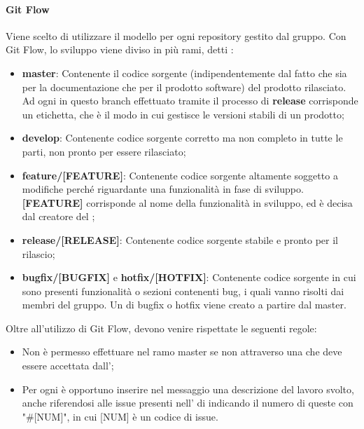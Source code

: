 \paragraph{Git Flow}
Viene scelto di utilizzare il modello  per ogni repository gestito dal gruppo.
Con Git Flow, lo sviluppo viene diviso in più rami, detti :
\begin{itemize}
	\item \textbf{master}: Contenente il codice sorgente (indipendentemente dal fatto che sia per la documentazione che per il prodotto software) del prodotto rilasciato.
	Ad ogni  in questo branch effettuato tramite il processo di \textbf{release} corrisponde un etichetta, che è il modo in cui  gestisce le versioni stabili di un prodotto;
	\item \textbf{develop}: Contenente codice sorgente corretto ma non completo in tutte le parti, non pronto per essere rilasciato;
	\item \textbf{feature/[FEATURE]}: Contenente codice sorgente altamente soggetto a modifiche perché riguardante una funzionalità in fase di sviluppo.
	\textbf{[FEATURE]} corrisponde al nome della funzionalità in sviluppo, ed è decisa dal creatore del ;
	\item \textbf{release/[RELEASE]}: Contenente codice sorgente stabile e pronto per il rilascio;
	\item \textbf{bugfix/[BUGFIX]} e \textbf{hotfix/[HOTFIX]}: Contenente codice sorgente in cui sono presenti funzionalità o sezioni contenenti bug, i quali vanno risolti dai membri del gruppo.
	Un  di bugfix o hotfix viene creato a partire dal  master.
\end{itemize}

Oltre all'utilizzo di Git Flow, devono venire rispettate le seguenti regole:
\begin{itemize}
	\item Non è permesso effettuare  nel ramo master se non attraverso una  che deve essere accettata dall’\Amministratore{};
	\item Per ogni  è opportuno inserire nel messaggio una descrizione del lavoro svolto, anche riferendosi alle issue presenti nell' di  indicando il numero di queste con "\#[NUM]", in cui [NUM] è un codice di issue.
\end{itemize}


